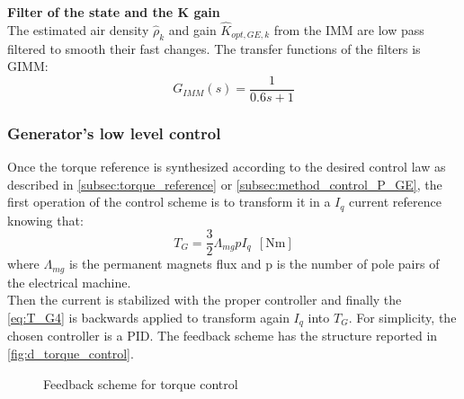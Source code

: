 \textbf{Filter of the state and the K gain}\\
The estimated air density $\hat{\rho}_{k}$ and gain $\hat{K}_{opt,GE,k}$ from the IMM are low pass filtered to smooth their fast changes. The transfer functions of the filters is \acrshort{GIMM}:  
\begin{equation}
  G_{IMM}(s) = \frac{1}{0.6s + 1}
\end{equation}

                                          

\subsubsection{Generator's low level control}\label{subsec:generator_low_level-control}
Once the torque reference is synthesized according to the desired control law as described in \autoref{subsec:torque_reference} or \autoref{subsec:method_control_P_GE}, the first operation of the control scheme is to transform it in a $I_q$ current reference knowing that:
\begin{equation}
    T_G = \frac{3}{2}\Lambda_{mg} p I_q \ \ \left[\si{\newton\meter}\right]
    \label{eq:T_G4}
\end{equation}
where $\Lambda_{mg}$ is the permanent magnets flux and p is the number of pole pairs of the electrical machine.\\
Then the current is stabilized with the proper controller and finally the \autoref{eq:T_G4} is backwards applied to transform again $I_q$ into $T_G$. For simplicity, the chosen controller is a \acrfull{PID}. The feedback scheme has the structure reported in \autoref{fig:d_torque_control}.

\begin{figure}[H]
    \centering
    
    \caption{Feedback scheme for torque control}
    \label{fig:d_torque_control}
\end{figure}

